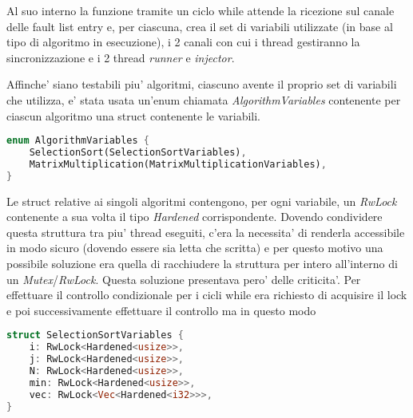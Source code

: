 Al suo interno la funzione tramite un ciclo while attende la ricezione sul canale delle fault list entry e, per ciascuna, crea il set di variabili utilizzate (in base al tipo di algoritmo in esecuzione), i 2 canali con cui i thread gestiranno la sincronizzazione e i 2 thread \textit{runner} e \textit{injector}.

Affinche' siano testabili piu' algoritmi, ciascuno avente il proprio set di variabili che utilizza, e' stata usata un'enum chiamata \textit{AlgorithmVariables} contenente per ciascun algoritmo una struct contenente le variabili. 

\begin{lstlisting}[language=Rust, style=boxed]
enum AlgorithmVariables {
    SelectionSort(SelectionSortVariables),
    MatrixMultiplication(MatrixMultiplicationVariables),
}
\end{lstlisting}

Le struct relative ai singoli algoritmi contengono, per ogni variabile, un \textit{RwLock} contenente a sua volta il tipo \textit{Hardened} corrispondente. Dovendo condividere questa struttura tra piu' thread eseguiti, c'era la necessita' di renderla accessibile in modo sicuro (dovendo essere sia letta che scritta) e per questo motivo una possibile soluzione era quella di racchiudere la struttura per intero all'interno di un \textit{Mutex}/\textit{RwLock}. Questa soluzione presentava pero' delle criticita'. Per effettuare il controllo condizionale per i cicli while era richiesto di acquisire il lock e poi successivamente effettuare il controllo ma in questo modo 


\begin{lstlisting}[language=Rust, style=boxed]
struct SelectionSortVariables {
    i: RwLock<Hardened<usize>>,
    j: RwLock<Hardened<usize>>,
    N: RwLock<Hardened<usize>>,
    min: RwLock<Hardened<usize>>,
    vec: RwLock<Vec<Hardened<i32>>>,
}
\end{lstlisting}

